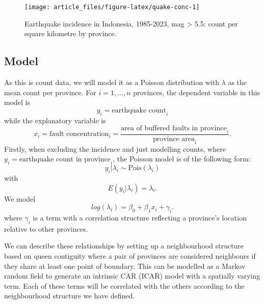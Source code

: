 \begin{figure}

{\centering \texttt{[image: article\_files/figure-latex/quake-conc-1]} 

}

\caption{Earthquake incidence in Indonesia, 1985-2023, mag > 5.5: count per square kilometre by province. }\label{fig:quake-conc}
\end{figure}

\hypertarget{model}{%
\subsection{Model}\label{model}}

As this is count data, we will model it as a Poisson distribution with
\(\lambda\) as the mean count per province. For \(i = 1,...,n\) provinces,
the dependent variable in this model is
\begin{equation}
y_i = \text{earthquake count}_i 
\label{eq:eq1}
\end{equation}
while the explanatory variable is
\begin{equation}
x_i = \text{fault concentration}_i = \frac{\text{area of buffered faults in province}_i} {\text{province area}_i}.
\label{eq:eq2}
\end{equation}
Firstly, when excluding the incidence and just modelling counts, where
\(y_i = \text{earthquake count in province}_i\), the Poisson model is of
the following form:
\begin{equation}
y_i | \lambda_i \sim \text{Pois}(\lambda_i)
\label{eq:eq3}
\end{equation}
with
\begin{equation}
E(y_i | \lambda_i) = \lambda_i.
\label{eq:eq4}
\end{equation}
We model
\begin{equation}
log(\lambda_i) = \beta_0 + \beta_1x_i + \gamma_i.
\label{eq:eq5}
\end{equation}
where \(\gamma_i\)
is a term with a correlation structure reflecting a province's location
relative to other provinces.

We can describe these relationships by setting up a neighbourhood
structure based on queen contiguity where a pair of provinces are
considered neighbours if they share at least one point of boundary. This can be modelled as a Markov random field to generate an intrinsic CAR (ICAR) model with a spatially varying term. Each of these terms will be correlated with the others according to the neighbourhood structure we have defined.

